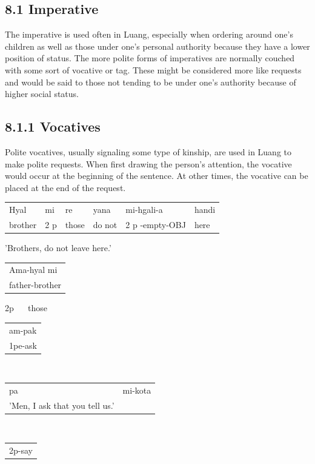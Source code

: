 \documentclass[10pt]{article}
\begin{document}
\subsection*{8.1 Imperative}
The imperative is used often in Luang, especially when ordering around one's children as well as those under one's personal authority because they have a lower position of status. The more polite forms of imperatives are normally couched with some sort of vocative or tag. These might be considered more like requests and would be said to those not tending to be under one's authority because of higher social status.

\subsection*{8.1.1 Vocatives}
Polite vocatives, usually signaling some type of kinship, are used in Luang to make polite requests. When first drawing the person's attention, the vocative would occur at the beginning of the sentence. At other times, the vocative can be placed at the end of the request.

\begin{center}
\begin{tabular}{llllll}
Hyal & mi & re & yana & mi-hgali-a & handi \\
brother & 2 p & those & do not & 2 p -empty-OBJ & here \\
\end{tabular}
\end{center}

'Brothers, do not leave here.'

\begin{center}
\begin{tabular}{l}
Ama-hyal mi \\
father-brother \\
\end{tabular}
\end{center} 2p \(\quad\) those \(\quad\)\begin{tabular}{l}
am-pak \\
1pe-ask \\
\end{tabular}\(\quad\)\begin{tabular}{ll}
pa & mi-kota \\
'Men, I ask that you tell us.' &  \\
\end{tabular}\(\quad\)\begin{tabular}{l}
2p-say \\
\end{tabular}
\end{document}
